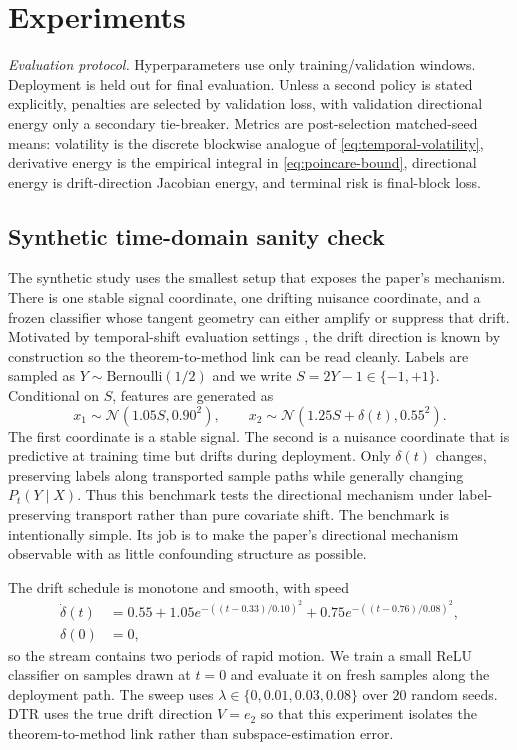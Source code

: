 \documentclass[conference]{IEEEtran}
\begin{document}
\section{Experiments}
\textit{Evaluation protocol.}
Hyperparameters use only training/validation windows. Deployment is held out for final evaluation. Unless a second policy is stated explicitly, penalties are selected by validation loss, with validation directional energy only a secondary tie-breaker. Metrics are post-selection matched-seed means: volatility is the discrete blockwise analogue of \eqref{eq:temporal-volatility}, derivative energy is the empirical integral in \eqref{eq:poincare-bound}, directional energy is drift-direction Jacobian energy, and terminal risk is final-block loss.

\subsection{Synthetic time-domain sanity check}
The synthetic study uses the smallest setup that exposes the paper's mechanism. There is one stable signal coordinate, one drifting nuisance coordinate, and a frozen classifier whose tangent geometry can either amplify or suppress that drift. Motivated by temporal-shift evaluation settings \cite{yao-wildtime,han-temporal}, the drift direction is known by construction so the theorem-to-method link can be read cleanly. Labels are sampled as $Y\sim\mathrm{Bernoulli}(1/2)$ and we write $S=2Y-1\in\{-1,+1\}$. Conditional on $S$, features are generated as
\[
x_1\sim\mathcal N(1.05S,0.90^2),
\qquad
x_2\sim\mathcal N(1.25S+\delta(t),0.55^2).
\]
The first coordinate is a stable signal. The second is a nuisance coordinate that is predictive at training time but drifts during deployment. Only $\delta(t)$ changes, preserving labels along transported sample paths while generally changing $P_t(Y\mid X)$. Thus this benchmark tests the directional mechanism under label-preserving transport rather than pure covariate shift.
The benchmark is intentionally simple. Its job is to make the paper's directional mechanism observable with as little confounding structure as possible.

The drift schedule is monotone and smooth, with speed
\begin{align*}
\dot\delta(t)
&=
0.55
+ 1.05e^{-((t-0.33)/0.10)^2}
+ 0.75e^{-((t-0.76)/0.08)^2}, \\
\delta(0) &= 0,
\end{align*}
so the stream contains two periods of rapid motion. We train a small ReLU classifier on samples drawn at $t=0$ and evaluate it on fresh samples along the deployment path. The sweep uses $\lambda\in\{0,0.01,0.03,0.08\}$ over $20$ random seeds. DTR uses the true drift direction $V=e_2$ so that this experiment isolates the theorem-to-method link rather than subspace-estimation error.
\end{document}
